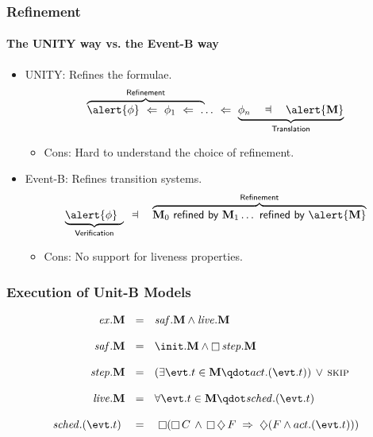 
\begin{frame}
  \frametitle{Refinement}
  \framesubtitle{The UNITY way vs. the Event-B way}


  \begin{itemize}
  \item UNITY: Refines the \alert{formulae}.
    \[
    \lefteqn{\overbrace{\phantom{\phi \wide\follows \phi_1
          \wide\follows \ldots \wide\follows
          \phi_n}}^{\textsf{Refinement}}} \alert{\phi} \wide\follows \phi_1
    \wide\follows \ldots \wide\follows \underbrace{\phi_n \WIDE\dashV
      \alert{\Mch}}_{\textsf{Translation}}
    \]
    \begin{itemize}
    \item<2-> Cons: \alert{Hard to understand} the choice of refinement.
    \end{itemize}
    \medskip

  \item Event-B: Refines \alert{transition systems}.
    \[
    \lefteqn{
      \underbrace{\phantom{\phi \WIDE\dashV
        \Mch_0}}_{\textsf{Verification}}}  \alert{\phi} \WIDE\dashV
        \overbrace{\Mch_0 \wide\abstracts \Mch_1 \ldots \wide\abstracts \alert{\Mch}}^{\textsf{Refinement}}
    \]
    \begin{itemize}
    \item<2-> Cons: No support for \alert{liveness properties}.
    \end{itemize}
  \end{itemize}

\end{frame}


\begin{frame}
  \frametitle{Execution of Unit-B Models}

  \begin{align}
    \execution.\Mch \Wide{&=} \safety.\Mch \land
    \liveness.\Mch \\[2ex]
    \safety.\Mch  \Wide{&=}  \init.\Mch \land \always \step.\Mch \\[2ex]
    \step.\Mch  \Wide{&=} (\exists \evt.t \in \Mch \qdot
    \act.(\evt.t)) \,\lor\, \SKIP \\[2ex]
    \liveness.\Mch \Wide{&=} \forall \evt.t \in \Mch \qdot
    \schedule.(\evt.t) \\[2ex]
    \schedule.(\evt.t) \WIDE{& =} \always (\always \csched
    \,\land\, \always \eventually \fsched  \wide{\limp} 
    \eventually (\fsched\land\act.(\evt.t)))
  \end{align}

\end{frame}


